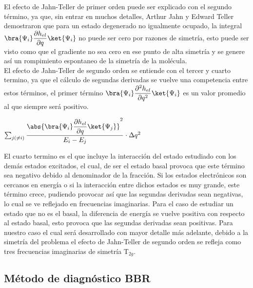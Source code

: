 \documentclass[12pt]{report}
\begin{document}
El efecto de Jahn-Teller de primer orden puede ser explicado con el segundo término, ya que, sin entrar en muchos detalles, Arthur Jahn y Edward Teller\cite{JT} demostraron que para un estado degenerado no igualmente ocupado, la integral $\bra{\Psi_i}\dfrac{\partial h_{el}}{\partial q}\ket{\Psi_i}$ no puede ser cero por razones de simetría, esto puede ser visto como que el gradiente no sea cero en ese punto de alta simetría y se genere así un rompimiento espontaneo de la simetría de la molécula.
\\


El efecto de Jahn-Teller de segundo orden se entiende con el tercer y cuarto termino, ya que el cálculo de segundas derivadas se vuelve una competencia entre estos términos, el primer término $\bra{\Psi_i}\dfrac{\partial^2 h_{el}}{\partial q^2}\ket{\Psi_i}$   es un valor promedio al que siempre será positivo. 

\begin{center}
$\sum_{j(\neq i)} \dfrac{\abs{\bra{\Psi_i}\dfrac{\partial h_{el}}{\partial q}\ket{\Psi_j}}^2}{E_i-E_j}\cdot\Delta q^2$
\end{center}

El cuarto termino es el que incluye la interacción del estado estudiado con los demás estados excitados, el cual, de ser el estado basal provoca que este término sea negativo debido al denominador de la fracción. Si los estados electrónicos son cercanos en energía o si la interacción entre dichos estados es muy grande, este término crece, pudiendo provocar así que las segundas derivadas sean negativas, lo cual se ve reflejado en frecuencias imaginarias. Para el caso de estudiar un estado que no es el basal, la diferencia de energía se vuelve positiva con respecto al estado basal, esto provoca que las segundas derivadas sean positivas. Para nuestro caso el cual será desarrollado con mayor detalle más adelante, debido a la simetría del problema el efecto de Jahn-Teller de segundo orden se refleja como tres frecuencias imaginarias de simetría T$_{2g}$.




\subsection{Método de diagnóstico BBR}
\end{document}
